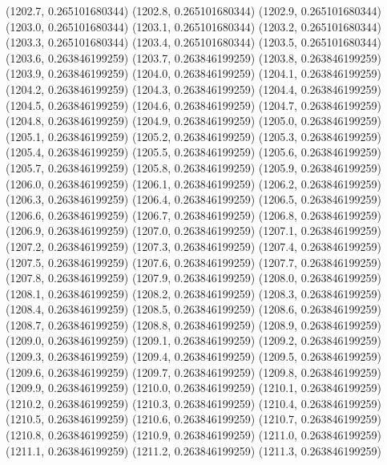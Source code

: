 {					(1202.7, 0.265101680344)
					(1202.8, 0.265101680344)
					(1202.9, 0.265101680344)
					(1203.0, 0.265101680344)
					(1203.1, 0.265101680344)
					(1203.2, 0.265101680344)
					(1203.3, 0.265101680344)
					(1203.4, 0.265101680344)
					(1203.5, 0.265101680344)
					(1203.6, 0.263846199259)
					(1203.7, 0.263846199259)
					(1203.8, 0.263846199259)
					(1203.9, 0.263846199259)
					(1204.0, 0.263846199259)
					(1204.1, 0.263846199259)
					(1204.2, 0.263846199259)
					(1204.3, 0.263846199259)
					(1204.4, 0.263846199259)
					(1204.5, 0.263846199259)
					(1204.6, 0.263846199259)
					(1204.7, 0.263846199259)
					(1204.8, 0.263846199259)
					(1204.9, 0.263846199259)
					(1205.0, 0.263846199259)
					(1205.1, 0.263846199259)
					(1205.2, 0.263846199259)
					(1205.3, 0.263846199259)
					(1205.4, 0.263846199259)
					(1205.5, 0.263846199259)
					(1205.6, 0.263846199259)
					(1205.7, 0.263846199259)
					(1205.8, 0.263846199259)
					(1205.9, 0.263846199259)
					(1206.0, 0.263846199259)
					(1206.1, 0.263846199259)
					(1206.2, 0.263846199259)
					(1206.3, 0.263846199259)
					(1206.4, 0.263846199259)
					(1206.5, 0.263846199259)
					(1206.6, 0.263846199259)
					(1206.7, 0.263846199259)
					(1206.8, 0.263846199259)
					(1206.9, 0.263846199259)
					(1207.0, 0.263846199259)
					(1207.1, 0.263846199259)
					(1207.2, 0.263846199259)
					(1207.3, 0.263846199259)
					(1207.4, 0.263846199259)
					(1207.5, 0.263846199259)
					(1207.6, 0.263846199259)
					(1207.7, 0.263846199259)
					(1207.8, 0.263846199259)
					(1207.9, 0.263846199259)
					(1208.0, 0.263846199259)
					(1208.1, 0.263846199259)
					(1208.2, 0.263846199259)
					(1208.3, 0.263846199259)
					(1208.4, 0.263846199259)
					(1208.5, 0.263846199259)
					(1208.6, 0.263846199259)
					(1208.7, 0.263846199259)
					(1208.8, 0.263846199259)
					(1208.9, 0.263846199259)
					(1209.0, 0.263846199259)
					(1209.1, 0.263846199259)
					(1209.2, 0.263846199259)
					(1209.3, 0.263846199259)
					(1209.4, 0.263846199259)
					(1209.5, 0.263846199259)
					(1209.6, 0.263846199259)
					(1209.7, 0.263846199259)
					(1209.8, 0.263846199259)
					(1209.9, 0.263846199259)
					(1210.0, 0.263846199259)
					(1210.1, 0.263846199259)
					(1210.2, 0.263846199259)
					(1210.3, 0.263846199259)
					(1210.4, 0.263846199259)
					(1210.5, 0.263846199259)
					(1210.6, 0.263846199259)
					(1210.7, 0.263846199259)
					(1210.8, 0.263846199259)
					(1210.9, 0.263846199259)
					(1211.0, 0.263846199259)
					(1211.1, 0.263846199259)
					(1211.2, 0.263846199259)
					(1211.3, 0.263846199259)
}
